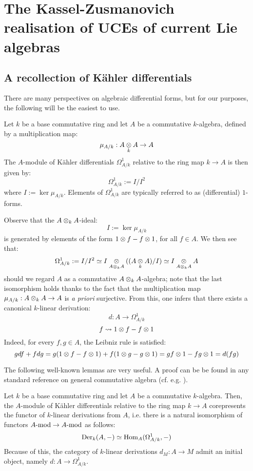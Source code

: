 \section{The Kassel-Zusmanovich realisation of UCEs of current Lie algebras}
    \subsection{A recollection of K\"ahler differentials}
        There are many perspectives on algebraic differential forms, but for our purposes, the following will be the easiest to use.
        \begin{definition} \label{def: kahler_differentials}
            Let $k$ be a base commutative ring and let $A$ be a commutative $k$-algebra, defined by a multiplication map:
                $$\mu_{A/k}: A \tensor_k A \to A$$
            The $A$-module of K\"ahler differentials $\Omega^1_{A/k}$ relative to the ring map $k \to A$ is then given by:
                $$\Omega^1_{A/k} := I/I^2$$
            where $I := \ker \mu_{A/k}$. Elements of $\Omega^1_{A/k}$ are typically referred to as (differential) $1$-forms.
        \end{definition}
        \begin{remark}
            Observe that the $A \tensor_k A$-ideal:
                $$I := \ker \mu_{A/k}$$
            is generated by elements of the form $1 \tensor f - f \tensor 1$, for all $f \in A$. We then see that:
                $$\Omega^1_{A/k} := I/I^2 \cong I \tensor_{A \tensor_k A} ( (A \tensor_k A)/I ) \cong I \tensor_{A \tensor_k A} A$$
            should we regard $A$ as a commutative $A \tensor_k A$-algebra; note that the last isomorphism holds thanks to the fact that the multiplication map $\mu_{A/k}: A \tensor_k A \to A$ is \textit{a priori} surjective. From this, one infers that there exists a canonical $k$-linear derivation:
                $$d: A \to \Omega^1_{A/k}$$
                $$f \mapsto 1 \tensor f - f \tensor 1$$
            Indeed, for every $f, g \in A$, the Leibniz rule is satisfied:
                $$g df + f dg = g(1 \tensor f - f \tensor 1) + f(1 \tensor g - g \tensor 1) = gf \tensor 1 - fg \tensor 1 = d(fg)$$
        \end{remark}
        The following well-known lemmas are very useful. A proof can be be found in any standard reference on general commutative algebra (cf. e.g. \cite[\href{https://stacks.math.columbia.edu/tag/00AO}{Tag 00AO}]{stacks}).
        \begin{lemma}
            Let $k$ be a base commutative ring and let $A$ be a commutative $k$-algebra. Then, the $A$-module of K\"ahler differentials relative to the ring map $k \to A$ corepresents the functor of $k$-linear derivations from $A$, i.e. there is a natural isomorphism of functors $A\mod \to A\mod$ as follows:
                $$\Der_k(A, -) \cong \Hom_A(\Omega^1_{A/k}, -)$$
            Because of this, the category of $k$-linear derivations $d_M: A \to M$ admit an initial object, namely $d: A \to \Omega^1_{A/k}$. 
        \end{lemma}
